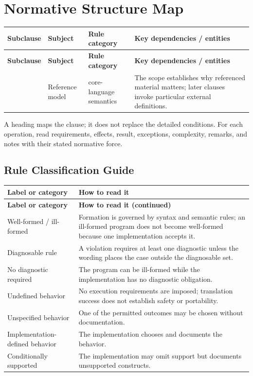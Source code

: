 \documentclass[11pt,letterpaper]{article}
\begin{document}
\section{Normative Structure Map}
\small\begin{longtable}{@{}>{\RaggedRight\arraybackslash}p{}>{\RaggedRight\arraybackslash}p{}>{\RaggedRight\arraybackslash}p{}>{\RaggedRight\arraybackslash}p{}@{}}
\toprule\textbf{Subclause} & \textbf{Subject} & \textbf{Rule category} & \textbf{Key dependencies / entities}\\\midrule\endfirsthead
\toprule\textbf{Subclause} & \textbf{Subject} & \textbf{Rule category} & \textbf{Key dependencies / entities}\\\midrule\endhead
\bottomrule\endfoot
2.1 & Reference model & core-language semantics & The scope establishes why referenced material matters; later clauses invoke particular external definitions.\\
\end{longtable}\normalsize
\begin{CornellReferenceNormativeBox}A heading maps the clause; it does not replace the detailed conditions. For each operation, read requirements, effects, result, exceptions, complexity, remarks, and notes with their stated normative force.\end{CornellReferenceNormativeBox}
\subsection*{Rule Classification Guide}
\small\begin{longtable}{@{}>{\RaggedRight\arraybackslash}p{}>{\RaggedRight\arraybackslash}p{}@{}}\toprule\textbf{Label or category} & \textbf{How to read it}\\\midrule\endfirsthead\toprule\textbf{Label or category} & \textbf{How to read it (continued)}\\\midrule\endhead\bottomrule\endfoot
Well-formed / ill-formed & Formation is governed by syntax and semantic rules; an ill-formed program does not become well-formed because one implementation accepts it.\\
Diagnosable rule & A violation requires at least one diagnostic unless the wording places the case outside the diagnosable set.\\
No diagnostic required & The program can be ill-formed while the implementation has no diagnostic obligation.\\
Undefined behavior & No execution requirements are imposed; translation success does not establish safety or portability.\\
Unspecified behavior & One of the permitted outcomes may be chosen without documentation.\\
Implementation-defined behavior & The implementation chooses and documents the behavior.\\
Conditionally supported & The implementation may omit support but documents unsupported constructs.\\
\end{longtable}\normalsize
\end{document}
